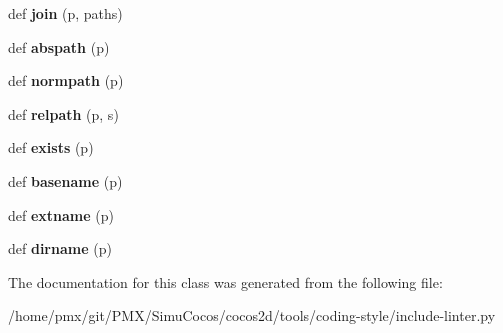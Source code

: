 \begin{DoxyCompactItemize}
def {\bfseries join} (p, paths)
\item 
\mbox{\label{classinclude-linter_1_1Path_a67131cb72904a4984c4deac014db9394}} 
def {\bfseries abspath} (p)
\item 
\mbox{\label{classinclude-linter_1_1Path_a3f582c404caa974def0890d078ece59d}} 
def {\bfseries normpath} (p)
\item 
\mbox{\label{classinclude-linter_1_1Path_a840e0daa536b8e17897b591b4673b07e}} 
def {\bfseries relpath} (p, s)
\item 
\mbox{\label{classinclude-linter_1_1Path_abeaa787b2bd6dd42c83c08b87e29826e}} 
def {\bfseries exists} (p)
\item 
\mbox{\label{classinclude-linter_1_1Path_a618903d12f4ccac62008def44d6218d3}} 
def {\bfseries basename} (p)
\item 
\mbox{\label{classinclude-linter_1_1Path_a8981e27310023930a313e0b74e4a2b9c}} 
def {\bfseries extname} (p)
\item 
\mbox{\label{classinclude-linter_1_1Path_a4f3857aa8fed071b72c4e10f3631a13f}} 
def {\bfseries dirname} (p)
\end{DoxyCompactItemize}


The documentation for this class was generated from the following file\+:\begin{DoxyCompactItemize}
\item 
/home/pmx/git/\+P\+M\+X/\+Simu\+Cocos/cocos2d/tools/coding-\/style/include-\/linter.\+py\end{DoxyCompactItemize}
